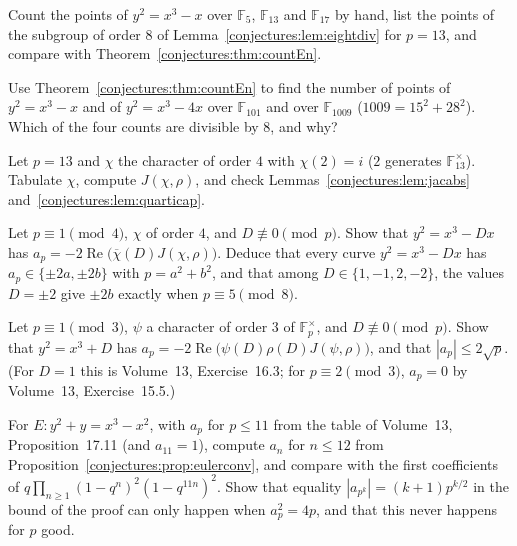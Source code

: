 \begin{exercise}[$\star$]\label{conjectures:ex:handcount}
Count the points of $y^2=x^3-x$ over $\mathbb F_5$, $\mathbb F_{13}$ and $\mathbb F_{17}$ by hand, list the points of the subgroup of order $8$ of
Lemma~\ref{conjectures:lem:eightdiv} for $p=13$, and compare with Theorem~\ref{conjectures:thm:countEn}.
\end{exercise}

\begin{exercise}[$\star$]\label{conjectures:ex:bigp}
Use Theorem~\ref{conjectures:thm:countEn} to find the number of points of $y^2=x^3-x$ and of $y^2=x^3-4x$ over $\mathbb F_{101}$ and over $\mathbb F_{1009}$
($1009=15^2+28^2$). Which of the four counts are divisible by $8$, and why?
\end{exercise}

\begin{exercise}[$\star\star$]\label{conjectures:ex:jac13}
Let $p=13$ and $\chi$ the character of order $4$ with $\chi(2)=i$ ($2$ generates $\mathbb F_{13}^\times$). Tabulate $\chi$, compute $J(\chi,\rho)$, and check
Lemmas~\ref{conjectures:lem:jacabs} and~\ref{conjectures:lem:quarticap}.
\end{exercise}

\begin{exercise}[$\star\star$]\label{conjectures:ex:quarticD}
Let $p\equiv1\pmod4$, $\chi$ of order $4$, and $D\not\equiv0\pmod p$. Show that $y^2=x^3-Dx$ has $a_p=-2\operatorname{Re}\bigl(\overline\chi(D)J(\chi,\rho)\bigr)$.
Deduce that every curve $y^2=x^3-Dx$ has $a_p\in\{\pm2a,\pm2b\}$ with $p=a^2+b^2$, and that among $D\in\{1,-1,2,-2\}$, the values $D=\pm2$ give $\pm2b$ exactly when
$p\equiv5\pmod8$.
\end{exercise}

\begin{exercise}[$\star\star$]\label{conjectures:ex:cubicD}
Let $p\equiv1\pmod3$, $\psi$ a character of order $3$ of $\mathbb F_p^\times$, and $D\not\equiv0\pmod p$. Show that $y^2=x^3+D$ has
$a_p=-2\operatorname{Re}\bigl(\psi(D)\rho(D)J(\psi,\rho)\bigr)$, and that $|a_p|\le2\sqrt p$. (For $D=1$ this is Volume~13, Exercise~16.3; for $p\equiv2\pmod3$,
$a_p=0$ by Volume~13, Exercise~15.5.)
\end{exercise}

\begin{exercise}[$\star\star$]\label{conjectures:ex:anbound}
For $E:y^2+y=x^3-x^2$, with $a_p$ for $p\le11$ from the table of Volume~13, Proposition~17.11 (and $a_{11}=1$), compute $a_n$ for $n\le12$ from
Proposition~\ref{conjectures:prop:eulerconv}, and compare with the first coefficients of $q\prod_{n\ge1}(1-q^n)^2(1-q^{11n})^2$. Show that equality $|a_{p^k}|=(k+1)p^{k/2}$
in the bound of the proof can only happen when $a_p^2=4p$, and that this never happens for $p$ good.
\end{exercise}

